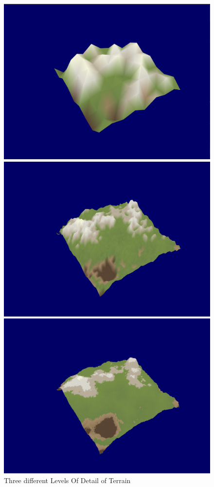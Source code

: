 \documentclass[a4paper,10pt]{report}
\begin{document}
\begin{figure}[h!]
\centering
\begin{minipage}{.3\textwidth}
  \centering
  \includegraphics[width=.9\linewidth]{Sprint10-1.png}
    \end{minipage}%
\begin{minipage}{.3\textwidth}
  \centering
  \includegraphics[width=.9\linewidth]{Sprint10-2.png}
\end{minipage}
\begin{minipage}{.3\textwidth}
  \centering
  \includegraphics[width=.9\linewidth]{Sprint10-3.png}
\end{minipage}
\caption{Three different Levels Of Detail of Terrain}
\end{figure}
\end{document}
